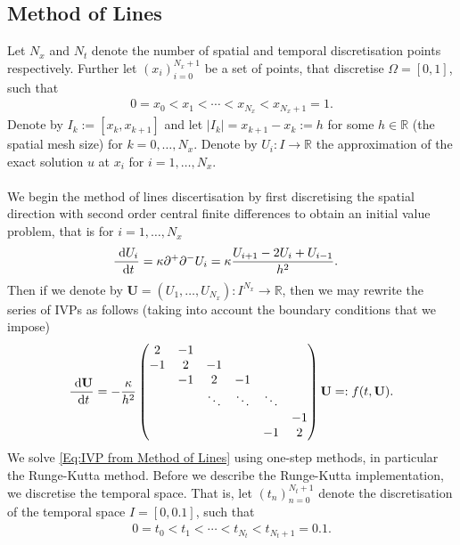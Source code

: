 \documentclass[a4paper,11pt]{article}
\theoremstyle{break}
\theoremstyle{break2}
\theoremstyle{break}
\theoremstyle{break2}
\newcommand{\R}{\mathbb{R}}
\newcommand{\de}{\textnormal{ d}}
\begin{document}
\subsection{Method of Lines}
Let $ N_x $ and $ N_t $ denote the number of spatial and temporal discretisation points respectively. Further let $ (x_i)_{i=0}^{N_x + 1} $ be a set of points, that discretise $ \Omega = [0,1] $, such that
\begin{align*}
0 = x_0 < x_1 < \cdots < x_{N_x} < x_{N_x + 1} = 1.
\end{align*}
Denote by $ I_k := [x_{k},x_{k+1}] $ and let $ |I_k| = x_{k+1} - x_{k} := h $ for some $ h \in \R $ (the spatial mesh size) for $ k = 0,\ldots,N_x $. Denote by $ U_i : I \to \R $ the approximation of the exact solution $ u $ at $ x_i $ for $ i = 1,\ldots,N_x $.
\\\\
We begin the method of lines discertisation by first discretising the spatial direction with second order central finite differences to obtain an initial value problem, that is for $ i = 1,\ldots,N_x $
\begin{align*}
\frac{\de U_i}{\de t} &= \kappa \partial^+\partial^- U_i = \kappa\frac{U_{i+1} - 2U_i + U_{i-1}}{h^2}.
\end{align*}
Then if we denote by $ \mathbf{U} = (U_1,\ldots,U_{N_x}) : I^{N_x} \to \R $, then we may rewrite the series of IVPs as follows (taking into account the boundary conditions that we impose) 
\begin{align}\label{Eq:IVP from Method of Lines}
\frac{\de \mathbf{U}}{\de t} = -\frac{\kappa}{h^2}
\begin{pmatrix}
2 & -1 & & & & \\
-1 & 2 & -1 & & & \\
& -1 & 2 & -1 & & \\
& & \ddots & \ddots & \ddots & \\
& & & & & -1 \\
& & & & -1 & 2
\end{pmatrix}
\mathbf{U} =: f(t,\mathbf{U}).
\end{align}
We solve \eqref{Eq:IVP from Method of Lines} using one-step methods, in particular the Runge-Kutta method. Before we describe the Runge-Kutta implementation, we discretise the temporal space. That is, let $ (t_n)_{n = 0}^{N_t + 1} $ denote the discretisation of the temporal space $ I = [0,0.1] $, such that
\begin{align*}
0 = t_0 < t_1 < \cdots < t_{N_t} < t_{N_t + 1} = 0.1.
\end{align*}
\end{document}
